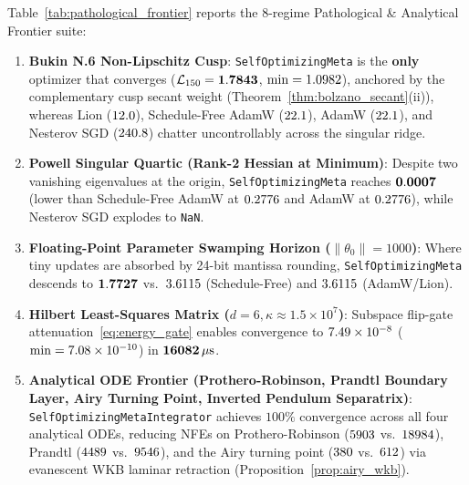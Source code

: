 \documentclass[10pt,twocolumn,letterpaper]{article}
\theoremstyle{definition}
\theoremstyle{remark}
\begin{document}
Table~\ref{tab:pathological_frontier} reports the 8-regime Pathological \& Analytical Frontier suite:
\begin{enumerate}[leftmargin=*,nosep]
  \item \textbf{Bukin N.6 Non-Lipschitz Cusp}: \texttt{SelfOptimizingMeta} is the \textbf{only} optimizer that converges ($\mathcal{L}_{150} = \mathbf{1.7843}$, $\min = 1.0982$), anchored by the complementary cusp secant weight (Theorem~\ref{thm:bolzano_secant}(ii)), whereas Lion ($12.0$), Schedule-Free AdamW ($22.1$), AdamW ($22.1$), and Nesterov SGD ($240.8$) chatter uncontrollably across the singular ridge.
  \item \textbf{Powell Singular Quartic (Rank-2 Hessian at Minimum)}: Despite two vanishing eigenvalues at the origin, \texttt{SelfOptimizingMeta} reaches $\mathbf{0.0007}$ (lower than Schedule-Free AdamW at $0.2776$ and AdamW at $0.2776$), while Nesterov SGD explodes to \texttt{NaN}.
  \item \textbf{Floating-Point Parameter Swamping Horizon ($\|\theta_0\| = 1000$)}: Where tiny updates are absorbed by 24-bit mantissa rounding, \texttt{SelfOptimizingMeta} descends to $\mathbf{1.7727}$ vs.\ $3.6115$ (Schedule-Free) and $3.6115$ (AdamW/Lion).
  \item \textbf{Hilbert Least-Squares Matrix ($d=6, \kappa \approx 1.5 \times 10^7$)}: Subspace flip-gate attenuation~\eqref{eq:energy_gate} enables convergence to $7.49 \times 10^{-8}$ ($\min = 7.08 \times 10^{-10}$) in $\mathbf{16082\,\mu\mathrm{s}}$.
  \item \textbf{Analytical ODE Frontier (Prothero-Robinson, Prandtl Boundary Layer, Airy Turning Point, Inverted Pendulum Separatrix)}: \texttt{SelfOptimizingMetaIntegrator} achieves $100\%$ convergence across all four analytical ODEs, reducing NFEs on Prothero-Robinson ($5903$ vs.\ $18984$), Prandtl ($4489$ vs.\ $9546$), and the Airy turning point ($380$ vs.\ $612$) via evanescent WKB laminar retraction (Proposition~\ref{prop:airy_wkb}).
\end{enumerate}


\end{document}
